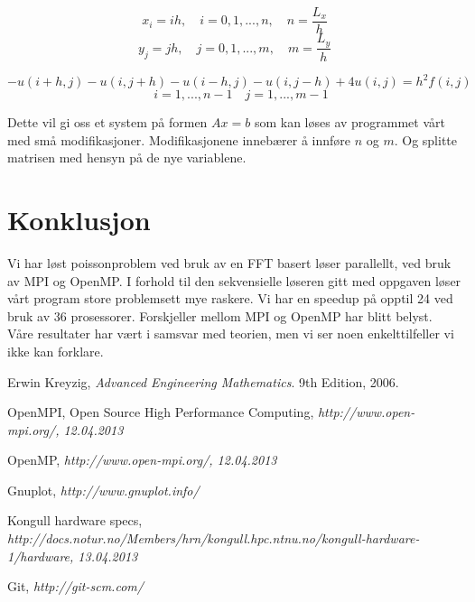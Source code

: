 \documentclass[11pt,norsk,a4paper]{article}
\begin{document}
$$ x_i = ih, \quad i=0,1,...,n, \quad n = \frac{L_x}{h}  $$
$$ y_j = jh, \quad j=0,1,...,m, \quad m = \frac{L_y}{h} $$ 

$$
-u(i+h,j)-u(i,j+h)-u(i-h,j)-u(i,j-h)+4u(i,j) = h^2f(i,j) $$
$$\quad i=1,...,n-1 \quad j=1,...,m-1$$

Dette vil gi oss et system på formen $Ax=b$ som kan løses av programmet vårt med små modifikasjoner. Modifikasjonene innebærer å innføre $n$ og $m$. Og splitte matrisen med hensyn på de nye variablene.

\section{Konklusjon}

Vi har løst poissonproblem ved bruk av en FFT basert løser parallellt, ved bruk av MPI og OpenMP. I forhold til den sekvensielle løseren gitt med oppgaven løser vårt program store problemsett mye raskere. Vi har en speedup på opptil 24 ved bruk av 36 prosessorer. Forskjeller mellom MPI og OpenMP har blitt belyst. Våre resultater har vært i samsvar med teorien, men vi ser noen enkelttilfeller vi ikke kan forklare.




\begin{thebibliography}{99}

Erwin Kreyzig,
\emph{Advanced Engineering Mathematics}.
9th Edition,
2006.

OpenMPI, Open Source High Performance Computing, \it{http://www.open-mpi.org/}, 12.04.2013

OpenMP, \it{http://www.open-mpi.org/}, 12.04.2013

Gnuplot, \it{http://www.gnuplot.info/}

Kongull hardware specs, \it{http://docs.notur.no/Members/hrn/kongull.hpc.ntnu.no/kongull-hardware-1/hardware}, 13.04.2013

Git, \it{http://git-scm.com/}

\end{thebibliography}

\listoffigures
\end{document}
